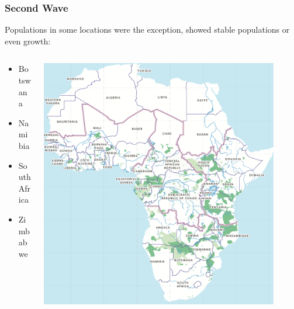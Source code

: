 \documentclass[10pt]{beamer}
\begin{document}
\begin{frame}[t]
\frametitle{Second Wave}
\vspace{0.5cm}

	Populations in some locations were the exception, showed stable populations or even growth:\\
	
	\vspace{0.25cm}
	
	\begin{columns}
		\begin{column}{0.5\textwidth}
			\begin{itemize}
				\item Botswana
				\smallskip
				\item Namibia
				\smallskip
				\item South Africa
				\smallskip
				\item Zimbabwe
			\end{itemize}
		\end{column}
		
		\begin{column}{0.5\textwidth}
			\begin{center}
				\includegraphics[width=0.90\textwidth]{figures/africa.png}
			\end{center}
		\end{column}
	\end{columns}
\end{frame}
\end{document}
